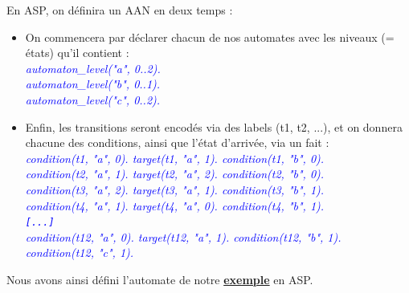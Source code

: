 \documentclass[12pt,a4paper]{article}
\begin{document}
En ASP, on définira un AAN en deux temps :
\begin{itemize}
	\item On commencera par déclarer chacun de nos automates avec les niveaux (= états) qu'il contient :\\
	\emph{
		\textcolor{blue}{
		automaton\_level("a", 0..2).\\
		automaton\_level("b", 0..1).\\
		automaton\_level("c", 0..2).\\
		}
	}
	\item Enfin, les transitions seront encodés via des labels (t1, t2, ...), et on donnera chacune des conditions, ainsi que l'état d'arrivée, via un fait :\\
	\emph{
		\textcolor{blue}{
		condition(t1, "a", 0). target(t1, "a", 1). condition(t1, "b", 0).\\
		condition(t2, "a", 1). target(t2, "a", 2). condition(t2, "b", 0).\\
		condition(t3, "a", 2). target(t3, "a", 1). condition(t3, "b", 1).\\
		condition(t4, "a", 1). target(t4, "a", 0). condition(t4, "b", 1).\\
		\verb![...]!\\
		condition(t12, "a", 0). target(t12, "a", 1). condition(t12, "b", 1). condition(t12, "c", 1).\\
		}
	}
\end{itemize}
Nous avons ainsi défini l'automate de notre \hyperlink{exemple}{\textbf{exemple}} en ASP.
\end{document}
